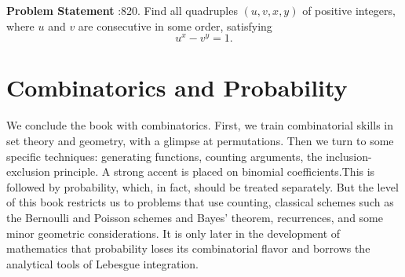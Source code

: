 \documentclass[10pt]{article}
\begin{document}
\textbf{Problem Statement} :820. Find all quadruples $(u, v, x, y)$ of positive integers, where $u$ and $v$ are consecutive in some order, satisfying$$ u^{x}-v^{y}=1 . $$\section{Combinatorics and Probability}We conclude the book with combinatorics. First, we train combinatorial skills in set theory and geometry, with a glimpse at permutations. Then we turn to some specific techniques: generating functions, counting arguments, the inclusion-exclusion principle. A strong accent is placed on binomial coefficients.This is followed by probability, which, in fact, should be treated separately. But the level of this book restricts us to problems that use counting, classical schemes such as the Bernoulli and Poisson schemes and Bayes' theorem, recurrences, and some minor geometric considerations. It is only later in the development of mathematics that probability loses its combinatorial flavor and borrows the analytical tools of Lebesgue integration.\\
\end{document}
